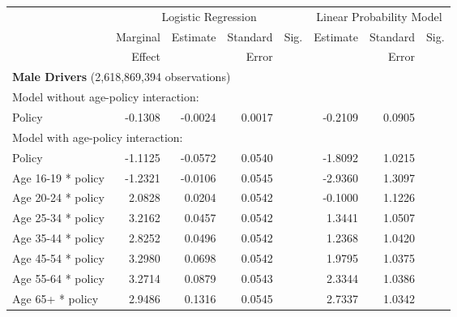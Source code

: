 
\begin{table}%
\centering 
\begin{tabular}{l r r r l r r l} 

\hline 
 
 & \multicolumn{4}{c}{Logistic Regression}  & \multicolumn{3}{c}{Linear Probability Model} \\ 

 \cmidrule(lr){2-5}\cmidrule(lr){6-8} 
 & Marginal & Estimate & Standard & Sig. & Estimate & Standard & Sig. \\ 
 &   Effect &          &  Error   &      &          &  Error   &     \\ 

\hline 
 
\multicolumn{7}{l}{\textbf{Male Drivers} (2,618,869,394 observations)} \\ 

\hline
\multicolumn{7}{l}{Model without age-policy interaction: } \\ 
Policy                   &  -0.1308       &  -0.0024        &  0.0017       &            &  -0.2109        &  0.0905       &            \\ 
\hline
\multicolumn{7}{l}{Model with age-policy interaction: } \\ 
Policy                   &  -1.1125       &  -0.0572        &  0.0540       &            &  -1.8092        &  1.0215       &            \\ 
Age 16-19 * policy   &  -1.2321       &  -0.0106        &  0.0545       &            &  -2.9360        &  1.3097       &            \\ 
Age 20-24 * policy   &  2.0828       &  0.0204        &  0.0542       &            &  -0.1000        &  1.1226       &            \\ 
Age 25-34 * policy   &  3.2162       &  0.0457        &  0.0542       &            &  1.3441        &  1.0507       &            \\ 
Age 35-44 * policy   &  2.8252       &  0.0496        &  0.0542       &            &  1.2368        &  1.0420       &            \\ 
Age 45-54 * policy   &  3.2980       &  0.0698        &  0.0542       &            &  1.9795        &  1.0375       &            \\ 
Age 55-64 * policy   &  3.2714       &  0.0879        &  0.0543       &            &  2.3344        &  1.0386       &            \\ 
Age 65+ * policy   &  2.9486       &  0.1316        &  0.0545       &            &  2.7337        &  1.0342       &            \\ 


\end{tabular}
\end{table}
